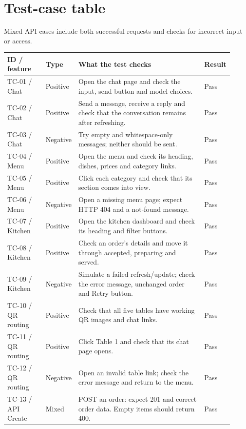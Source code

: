 \documentclass[10pt,a4paper]{article}
\begin{document}
\section{Test-case table}

Mixed API cases include both successful requests and checks for incorrect input or access.

\small
\begin{longtable}{p{0.17\linewidth}p{0.11\linewidth}p{0.57\linewidth}p{0.07\linewidth}}
\toprule
\textbf{ID / feature} & \textbf{Type} & \textbf{What the test checks} & \textbf{Result} \\ \midrule \endhead
TC-01 / Chat & Positive & Open the chat page and check the input, send button and model choices. & Pass \\
TC-02 / Chat & Positive & Send a message, receive a reply and check that the conversation remains after refreshing. & Pass \\
TC-03 / Chat & Negative & Try empty and whitespace-only messages; neither should be sent. & Pass \\
TC-04 / Menu & Positive & Open the menu and check its heading, dishes, prices and category links. & Pass \\
TC-05 / Menu & Positive & Click each category and check that its section comes into view. & Pass \\
TC-06 / Menu & Negative & Open a missing menu page; expect HTTP 404 and a not-found message. & Pass \\
TC-07 / Kitchen & Positive & Open the kitchen dashboard and check its heading and filter buttons. & Pass \\
TC-08 / Kitchen & Positive & Check an order's details and move it through accepted, preparing and served. & Pass \\
TC-09 / Kitchen & Negative & Simulate a failed refresh/update; check the error message, unchanged order and Retry button. & Pass \\
TC-10 / QR routing & Positive & Check that all five tables have working QR images and chat links. & Pass \\
TC-11 / QR routing & Positive & Click Table 1 and check that its chat page opens. & Pass \\
TC-12 / QR routing & Negative & Open an invalid table link; check the error message and return to the menu. & Pass \\
TC-13 / API Create & Mixed & POST an order: expect 201 and correct order data. Empty items should return 400. & Pass \\

\end{longtable}
\end{document}
